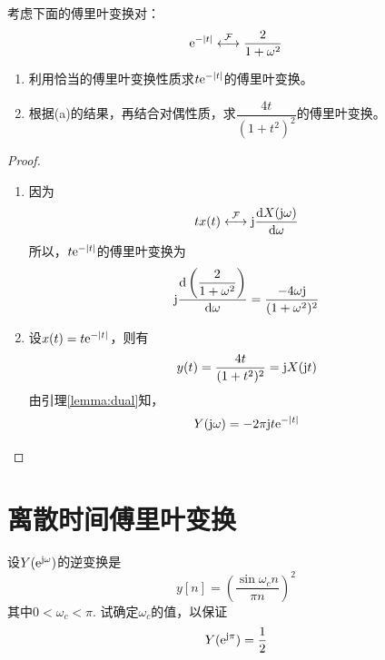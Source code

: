 \begin{proposition}

    考虑下面的傅里叶变换对：
    $$\mathrm{e}^{-|t|} \stackrel{\mathcal{F}}{\longleftrightarrow} \dfrac{2}{1 + \omega^2}$$

    \begin{enumerate}

        \item 利用恰当的傅里叶变换性质求$t\mathrm{e}^{-|t|}$的傅里叶变换。
        
        \item 根据\textup{(a)}的结果，再结合对偶性质，求$\dfrac{4t}{(1 + t^2)^2}$的傅里叶变换。

    \end{enumerate}

\end{proposition}

\begin{proof}

    \begin{enumerate}

        \item 
            因为
            $$tx(t) \stackrel{\mathcal{F}}{\longleftrightarrow} \mathrm{j} \dfrac{\mathrm{d} X(\mathrm{j} \omega)}{\mathrm{d} \omega}$$
            所以，$t\mathrm{e}^{-|t|}$的傅里叶变换为
            $$\mathrm{j} \dfrac{\mathrm{d} \left( \dfrac{2}{1 + \omega^2} \right)}{\mathrm{d} \omega} = \dfrac{-4\omega \mathrm{j}}{(1 + \omega^2)^2}$$
        
        \item 
            设$x(t) = t\mathrm{e}^{-|t|}$，则有
            $$y(t) = \dfrac{4t}{(1 + t^2)^2} = \mathrm{j} X(\mathrm{j} t)$$
            由引理\ref{lemma:dual}知，
            $$Y(\mathrm{j} \omega) = -2 \pi \mathrm{j} t \mathrm{e}^{-|t|}$$

    \end{enumerate}

\end{proof}

\section{离散时间傅里叶变换}

\begin{proposition}
    
    设$Y(\mathrm{e}^{\mathrm{j} \omega})$的逆变换是
    $$y[n] = \left( \dfrac{\sin{\omega_c n}}{\pi n} \right)^2$$
    其中$0 < \omega_c < \pi$. 试确定$\omega_c$的值，以保证
    $$Y(\mathrm{e}^{\mathrm{j} \pi}) = \dfrac{1}{2}$$

\end{proposition}

